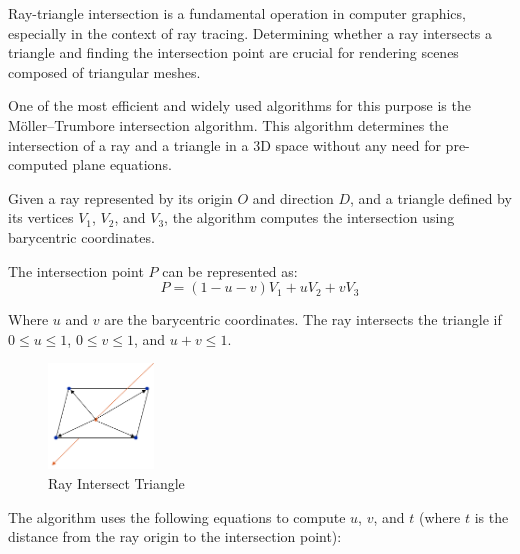 \documentclass[11pt, a4paper,oneside,chapterprefix=false]{scrbook}
\begin{document}
Ray-triangle intersection is a fundamental operation in computer graphics, especially in the context of ray tracing. Determining whether a ray intersects a triangle and finding the intersection point are crucial for rendering scenes composed of triangular meshes.

\vspace{10pt}

One of the most efficient and widely used algorithms for this purpose is the Möller–Trumbore intersection algorithm. This algorithm determines the intersection of a ray and a triangle in a 3D space without any need for pre-computed plane equations.

\vspace{10pt}

Given a ray represented by its origin \( O \) and direction \( D \), and a triangle defined by its vertices \( V_1 \), \( V_2 \), and \( V_3 \), the algorithm computes the intersection using barycentric coordinates.

\vspace{10pt}

The intersection point \( P \) can be represented as:
\[ P = (1 - u - v) V_1 + u V_2 + v V_3 \]

Where \( u \) and \( v \) are the barycentric coordinates. The ray intersects the triangle if \( 0 \leq u \leq 1 \), \( 0 \leq v \leq 1 \), and \( u + v \leq 1 \).

\begin{minipage}{\textwidth}
	\begin{figure}[H]
		\centering
		\includegraphics*[width=0.25\textwidth]{figures/intersect polygon.png}
		\caption{Ray Intersect Triangle}
		\label{fig:ray intersect triangle}
	\end{figure}
\end{minipage}

The algorithm uses the following equations to compute \( u \), \( v \), and \( t \) (where \( t \) is the distance from the ray origin to the intersection point):
\end{document}
